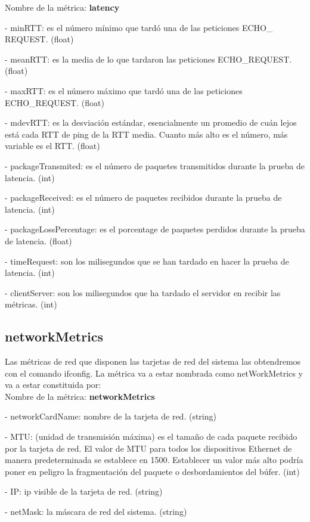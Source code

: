 \documentclass[ spanish, a4paper, 12pt, oneside]{report}
\begin{document}
Nombre de la métrica: \textbf{latency}

\hyp{} minRTT: es el número mínimo que tardó una  de las peticiones ECHO\_ REQUEST. (float)

\hyp{} meanRTT: es la media de lo que tardaron las peticiones ECHO\_REQUEST. (float)

\hyp{} maxRTT: es el número máximo que tardó una de las peticiones ECHO\_REQUEST. (float)

\hyp{} mdevRTT: es la desviación estándar, esencialmente un promedio de cuán lejos está cada RTT de ping de la RTT media. 
Cuanto más alto es el número, más variable es el RTT. (float)

\hyp{} packageTransmited: es el número de paquetes transmitidos durante la prueba de latencia. (int)

\hyp{} packageReceived: es el número de paquetes recibidos durante la prueba de latencia. (int)

\hyp{} packageLossPercentage: es el porcentage de paquetes perdidos durante la prueba de latencia. (float)

\hyp{} timeRequest: son los milisegundos que se han tardado en hacer la prueba de latencia. (int)

\hyp{} clientServer: son los milisegundos que ha tardado el servidor en recibir las métricas. (int) 

\subsection{networkMetrics}
Las métricas de red que disponen las tarjetas de red del sistema las obtendremos con el comando ifconfig.
La métrica va a estar nombrada como netWorkMetrics y va a estar constituida por:\\
  
Nombre de la métrica: \textbf{networkMetrics}

\hyp{} networkCardName: nombre de la tarjeta de red. (string)

\hyp{} MTU: (unidad de transmisión máxima) es el tamaño de cada paquete recibido por la tarjeta de red. El valor de MTU para todos 
los dispositivos Ethernet de manera predeterminada se establece en 1500. Establecer un valor más alto podría poner en peligro 
la fragmentación del paquete o desbordamientos del búfer. (int)

\hyp{} IP: ip visible de la tarjeta de red. (string)

\hyp{} netMask: la máscara de red del sistema. (string)
\end{document}
